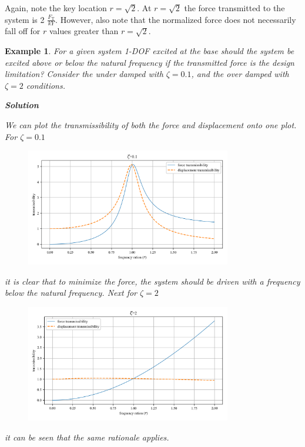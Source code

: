 \documentclass[12pt,letter]{article}
\newtheorem{ex}{Example}
\numberwithin{ex}{section} %
\newenvironment{example}{\begin{mdframed}[middlelinewidth=0.5mm]\begin{ex}\normalfont}{\end{ex}\end{mdframed}}
\begin{document}
Again, note the key location $r=\sqrt{2}$. At $r=\sqrt{2}$ the force transmitted to the system is 2 $\frac{F_\text{T}}{kY}$. However, also note that the normalized force does not necessarily fall off for $r$ values greater than $r=\sqrt{2}$.  

\begin{example}


			For a given system 1-DOF excited at the base should the system be excited above or below the natural frequency if the transmitted force is the design limitation? Consider the under damped with $\zeta=0.1$, and the over damped with $\zeta=2$ conditions. 

			\textbf{Solution}
			
			We can plot the transmissibility of both the force and displacement onto one plot. For $\zeta=0.1$
			\begin{figure}[H]
				\centering
				\includegraphics[width=0.8\textwidth]{../Figures/example_1_force_displacement_transmissibility_1.png}
			\end{figure}
			it is clear that to minimize the force, the system should be driven with a frequency below the natural frequency. Next for  $\zeta=2$
			\begin{figure}[H]
				\centering
				\includegraphics[width=0.8\textwidth]{../Figures/example_1_force_displacement_transmissibility_2.png}
			\end{figure}			
			it can be seen that the same rationale applies. 

\end{example}
\end{document}
